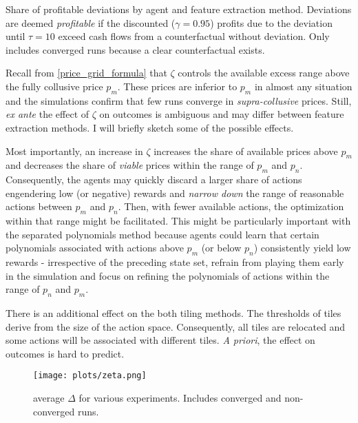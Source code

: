 \begin{center}
	\begin{table}
		
		\caption{Share of profitable deviations by agent and feature extraction method. Deviations are deemed \emph{profitable} if the discounted ($\gamma = 0.95$) profits due to the deviation until $\tau = 10$  exceed cash flows from a counterfactual without deviation. Only includes converged runs because a clear counterfactual exists.}
		\label{share_deviation_profitability_m}
	\end{table}
\end{center}



Recall from \autoref{price_grid_formula} that $\zeta$ controls the available excess range above the fully collusive price $p_m$. These prices are inferior to $p_m$ in almost any situation and the simulations confirm that few runs converge in \emph{supra-collusive} prices. Still, \emph{ex ante} the effect of $\zeta$ on outcomes is ambiguous and may differ between feature extraction methods. I will briefly sketch some of the possible effects.

Most importantly, an increase in $\zeta$ increases the share of available prices above $p_m$ and decreases the share of \emph{viable} prices within the range of $p_m$ and $p_n$. Consequently, the agents may quickly discard a larger share of actions engendering low (or negative) rewards and \emph{narrow down} the range of reasonable actions between $p_m$ and $p_n$. Then, with fewer available actions, the optimization within that range might be facilitated. This might be particularly important with the separated polynomials method because agents could learn that certain polynomials associated with actions above $p_m$ (or below $p_n$) consistently yield low rewards - irrespective of the preceding state set, refrain from playing them early in the simulation and focus on refining the polynomials of actions within the range of $p_n$ and $p_m$.

There is an additional effect on the both tiling methods. The thresholds of tiles derive from the size of the action space. Consequently, all tiles are relocated and some actions will be associated with different tiles. \emph{A priori}, the effect on outcomes is hard to predict.

 \begin{figure}
	\texttt{[image: plots/zeta.png]}
	\caption{average $\Delta$ for various experiments. Includes converged and non-converged runs.}
	\label{zeta}
\end{figure}

